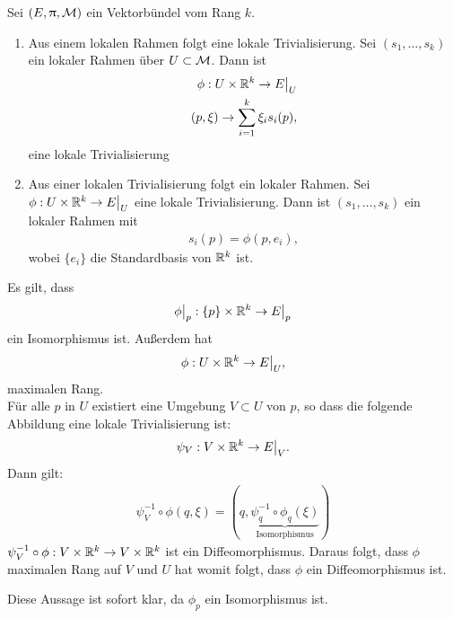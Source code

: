 \begin{satz}
\label{satz:lokalrahmentrivialisierung}
Sei $(E, \uppi, \mathcal{M})$ ein Vektorbündel vom Rang $k$.
\begin{enumerate}
\item Aus einem lokalen Rahmen folgt eine lokale Trivialisierung.
Sei $(s_1, \dots, s_k)$ ein lokaler Rahmen über $U\subset\mathcal{M}$.
Dann ist 
\begin{align}
\phi : U \times \mathbb{R}^k \to E \big\vert_U\\
(p, \xi) \to \sum^k_{i=1} \xi_i s_i (p),
\end{align}
eine lokale Trivialisierung
\item  Aus einer lokalen Trivialisierung folgt ein lokaler Rahmen.
Sei $\phi: U \times \mathbb{R}^k \to E \big\vert_U$ eine lokale Trivialisierung.
Dann ist $(s_1, \dots, s_k)$ ein lokaler Rahmen mit 
\begin{align}
s_i(p) = \phi (p, e_i),
\end{align} 
wobei $\{ e_i \}$ die Standardbasis von $\mathbb{R}^k$ ist.
\end{enumerate}
\end{satz}
\begin{bew}
Es gilt, dass 
\begin{align}
\phi \big\vert_p : \{ p \} \times \mathbb{R}^k \to E \big\vert_p
\end{align}
ein Isomorphismus ist.
Außerdem hat
\begin{align}
\phi : U \times \mathbb{R}^k \to E \big\vert_U,
\end{align}
maximalen Rang.\\
Für alle $p$ in $U$ existiert eine Umgebung $V \subset U$ von $p$, so dass die folgende Abbildung eine lokale Trivialisierung ist:
\begin{align}
\psi_V : V\times \mathbb{R}^k \to E \big\vert_V.
\end{align}
Dann gilt:
\begin{align}
\psi^{-1}_V \circ  \phi (q, \xi) = (q, \underbrace{\psi^{-1}_q \circ \phi_q(\xi)}_{\mathrm{Isomorphismus}})
\end{align}
$\psi^{-1}_V \circ \phi : V \times \mathbb{R}^k \to V \times \mathbb{R}^k$ ist ein Diffeomorphismus.
Daraus folgt, dass $\phi$ maximalen Rang auf $V$ und $U$ hat womit folgt, dass $\phi$ ein Diffeomorphismus ist.
\end{bew}
\begin{bew}
Diese Aussage ist sofort klar, da $\phi_p$ ein Isomorphismus ist.
\end{bew}

